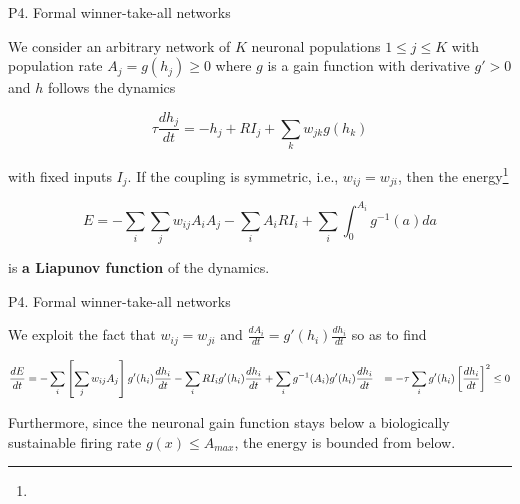 \documentclass[xcolor=table,dvipsnames,svgnames,aspectratio=169,fontset=fandol]{ctexbeamer}
\let\\\relax
\begin{document}
\begin{frame}{P4. Formal winner-take-all networks}

  We consider an arbitrary network of $K$ neuronal populations $1 \leq j \leq K$ with population rate $A_j = g(h_j) \geq 0$ where $g$ is a gain function with derivative $g' > 0$ and $h$ follows the dynamics

  $$\tau\frac{dh_j}{dt}=-h_j+RI_j+\sum\limits_k w_{jk}g(h_k)$$

  with fixed inputs $I_j$. If the coupling is symmetric, i.e., $w_{ij} = w_{ji}$, then the energy\footnote{}   

  $$E=-\sum\limits_i\sum\limits_j w_{ij} A_i A_j-\sum\limits_i A_i RI_i+\sum\limits_i\int_{0}^{A_i}g^{-1}(a)da$$

  is \textbf{a Liapunov function} of the dynamics.
\end{frame}

\begin{frame}{P4. Formal winner-take-all networks}

  We exploit the fact that $w_{ij} = w_{ji}$ and $\frac{dA_i}{dt}=g'(h_i)\frac{dh_i}{dt}$ so as to find

  \begin{equation*}
    \begin{aligned}
      \frac{dE}{dt}&=-\sum\limits_i \left[\sum\limits_j w_{ij}A_j\right]g'(h_i)\frac{dh_i}{dt}-\sum\limits_i RI_ig'(h_i)\frac{dh_i}{dt}+\sum\limits_i g^{-1}(A_i)g'(h_i)\frac{dh_i}{dt}\\
      &=-\tau \sum\limits_i g'(h_i)\left[\frac{dh_i}{dt}\right]^2 \leq 0 \\
    \end{aligned}
  \end{equation*}

  Furthermore, since the neuronal gain function stays below a biologically sustainable firing rate $g(x) \leq A_{max}$, the energy is bounded from below.


\end{frame}


\end{document}
